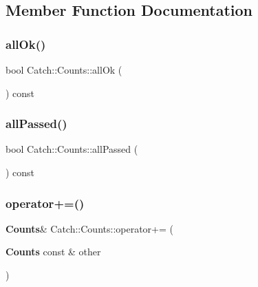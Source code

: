 \subsection{Member Function Documentation}
\mbox{\label{struct_catch_1_1_counts_a33bd996e016030155b99fe1c51c08991}} 
\subsubsection{all\+Ok()}
{\footnotesize\ttfamily bool Catch\+::\+Counts\+::all\+Ok (\begin{DoxyParamCaption}{ }\end{DoxyParamCaption}) const\hspace{0.3cm}{\ttfamily [inline]}}

\mbox{\label{struct_catch_1_1_counts_a84999490e0ecaa3de5e121bf48eda1b3}} 
\subsubsection{all\+Passed()}
{\footnotesize\ttfamily bool Catch\+::\+Counts\+::all\+Passed (\begin{DoxyParamCaption}{ }\end{DoxyParamCaption}) const\hspace{0.3cm}{\ttfamily [inline]}}

\mbox{\label{struct_catch_1_1_counts_a322a89475cd2cc039140ef371e973677}} 
\subsubsection{operator+=()}
{\footnotesize\ttfamily \textbf{ Counts}\& Catch\+::\+Counts\+::operator+= (\begin{DoxyParamCaption}\item[{\textbf{ Counts} const \&}]{other }\end{DoxyParamCaption})\hspace{0.3cm}{\ttfamily [inline]}}

\mbox{\label{struct_catch_1_1_counts_aaa10666f559057e3e860d2a5a6fae4c4}} 
